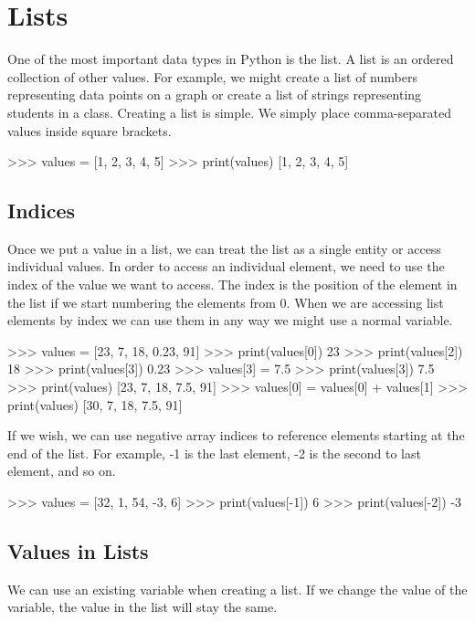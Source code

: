 \documentclass[11pt]{cselabheader}
\begin{document}
\tableofcontents

\pagebreak

\section{Lists}
One of the most important data types in Python is the list. A list is an ordered
collection of other values. For example, we might create a list of numbers
representing data points on a graph or create a list of strings representing
students in a class. Creating a list is simple. We simply place comma-separated
values inside square brackets.

\begin{pyconcode}
>>> values = [1, 2, 3, 4, 5]
>>> print(values)
[1, 2, 3, 4, 5]
\end{pyconcode}

\subsection{Indices}
Once we put a value in a list, we can treat the list as a single entity or
access individual values. In order to access an individual element, we need to
use the index of the value we want to access. The index is the position of the
element in the list if we start numbering the elements from 0. When we are
accessing list elements by index we can use them in any way we might use a
normal variable.

\begin{pyconcode}
>>> values = [23, 7, 18, 0.23, 91]
>>> print(values[0])
23
>>> print(values[2])
18
>>> print(values[3])
0.23
>>> values[3] = 7.5
>>> print(values[3])
7.5
>>> print(values)
[23, 7, 18, 7.5, 91]
>>> values[0] = values[0] + values[1]
>>> print(values)
[30, 7, 18, 7.5, 91]
\end{pyconcode}

If we wish, we can use negative array indices to reference elements starting at
the end of the list. For example, -1 is the last element, -2 is the second to
last element, and so on.

\begin{pyconcode}
>>> values = [32, 1, 54, -3, 6]
>>> print(values[-1])
6
>>> print(values[-2])
-3
\end{pyconcode}

\subsection{Values in Lists}
We can use an existing variable when creating a list. If we change the value of
the variable, the value in the list will stay the same.
\end{document}
